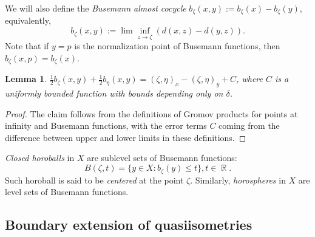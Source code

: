 \documentclass[12pt]{amsbook}%
\newtheorem{lem}[thm]{Lemma}
\theoremstyle{definition}
\theoremstyle{remark}
\numberwithin{section}{chapter}
\numberwithin{subsection}{section}
\numberwithin{figure}{chapter}
\def\half{\frac{1}{2}}
\DeclareMathOperator{\R}{\mathbb{R}}
\begin{document}
We will also define the {\em Busemann almost cocycle} $b_\zeta(x,y):= b_\zeta(x)-b_\zeta(y)$, equivalently, 
\begin{equation}\label{eq:busemanncocycle} 
b_\zeta(x,y):= \lim\inf_{z\to \zeta} (d(x, z)- d(y,z)). 
\end{equation}
Note that if $y=p$ is the normalization point of Busemann functions, then $b_\zeta(x,p)=b_\zeta(x)$. 

\begin{lem}\label{lem:almost cocycle}
$\half b_\zeta(x,y) + \half b_\eta(x,y)= (\zeta,\eta)_x- (\zeta,\eta)_y + C$, where $C$ is a uniformly bounded function with bounds depending only on $\delta$. 
\end{lem}
\begin{proof} The claim follows from the definitions of Gromov products for points at infinity and Busemann functions, with the error terms $C$ coming from the difference between upper and lower limits in these definitions. \end{proof}


{\em Closed horoballs} in $X$ are sublevel sets of Busemann functions:
$$
B(\zeta,t)= \{y\in X: b_\zeta(y)\le t\}, t\in \R. 
$$
Such horoball is said to be {\em centered} at the point $\zeta$.    
Similarly, {\em horospheres} in $X$ are level sets of Busemann functions. 




\subsection{Boundary extension of quasiisometries}
\end{document}
